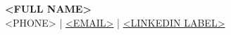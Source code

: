 \begin{center}
{\fontsize{22pt}{26pt}\selectfont\textbf{<FULL NAME>}}\\[8pt]
<PHONE> \;|\; \href{mailto:<EMAIL>}{<EMAIL>} \;|\; \href{<LINKEDIN URL>}{<LINKEDIN LABEL>}
\end{center}

\vspace{6pt}

\raggedright




